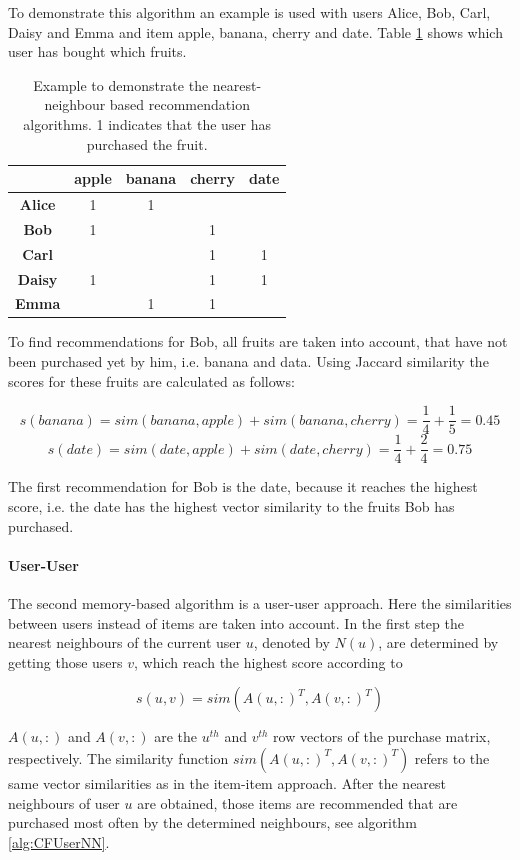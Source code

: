 \documentclass[10pt]{reportMaster}
\begin{document}
To demonstrate this algorithm an example is used with users Alice, Bob, Carl, Daisy and Emma and item apple, banana, cherry and date.
Table \ref{tab:example} shows which user has bought which fruits.
\begin{table}[h!]
	\begin{tabular}{|c|c|c|c|c|}
		\hline
		&\textbf{apple}&\textbf{banana}&\textbf{cherry}&\textbf{date}\\ \hline
		\textbf{Alice}&1&1&&\\ \hline
		\textbf{Bob}&1&&1&\\ \hline	
		\textbf{Carl}&&&1&1\\ \hline	
		\textbf{Daisy}&1&&1&1\\ \hline	
		\textbf{Emma}&&1&1&\\ \hline	
	\end{tabular}
	\caption[Example for nearest-neighbour based algorithms]{Example to demonstrate the nearest-neighbour based recommendation algorithms. 1 indicates that the user has purchased the fruit.}	
	\label{tab:example}
\end{table}

To find recommendations for Bob, all fruits are taken into account, that have not been purchased yet by him, i.e. banana and data.
Using Jaccard similarity the scores for these fruits are calculated as follows:

$$s(banana) = sim(banana, apple) + sim(banana, cherry) = \frac{1}{4} + \frac{1}{5} = 0.45$$
$$s(date) = sim(date, apple) + sim(date, cherry) = \frac{1}{4} + \frac{2}{4} = 0.75$$

The first recommendation for Bob is the date, because it reaches the highest score, i.e. the date has the highest vector similarity to the fruits Bob has purchased.


\paragraph{User-User}
The second memory-based algorithm is a user-user approach. %
Here the similarities between users instead of items are taken into account.
In the first step the nearest neighbours of the current user $u$, denoted by $N(u)$, are determined by getting those users $v$, which reach the highest score according to

$$
s(u,v) = sim(A(u,:)^T, A(v, :)^T)
$$

$A(u,:)$ and $A(v,:)$ are the $u^{th}$ and $v^{th}$ row vectors of the purchase matrix, respectively.
The similarity function $sim(A(u,:)^T, A(v, :)^T)$ refers to the same vector similarities as in the item-item approach.
After the nearest neighbours of user $u$ are obtained, those items are recommended that are purchased most often by the determined neighbours, see algorithm \ref{alg:CFUserNN}.
\end{document}
